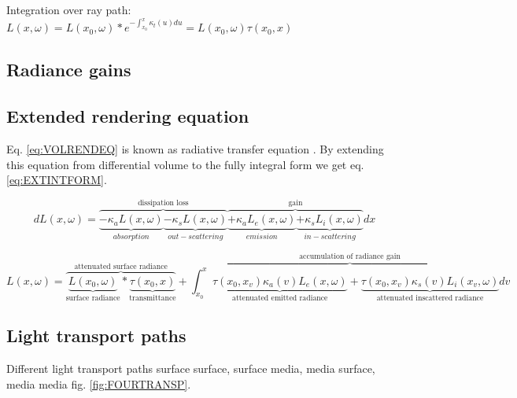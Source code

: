 Integration over ray path:
$L(x,\omega)=L(x_0,\omega)*e^{-\int_{x_{0}}^{x}\kappa_t(u)du}=L(x_0,\omega)\tau(x_0,x)$


\subsection{Radiance gains}


\subsection{Extended rendering equation}
 Eq. \ref{eq:VOLRENDEQ} is known as radiative transfer equation \cite{chandrasekhar1960radiative}. By extending this equation from differential volume to the fully integral form we get eq. \ref{eq:EXTINTFORM}.

\begin{equation}
\label{eq:VOLRENDEQ}
dL(x,\omega)=\overbrace{\underbrace{{-\kappa_{a}L(x,\omega)} }_{absorption}\underbrace{-\kappa_{s}L(x,\omega)} _{out-scattering} }^\text{dissipation loss}\overbrace{\underbrace{{+\kappa_{a}L_{e}(x,\omega)} }_{emission}\underbrace{+\kappa_{s}L_{i}(x,\omega)} _{in-scattering} }^\text{gain}dx
 \end{equation}
 
 \begin{equation}
 \label{eq:EXTINTFORM}
 L(x,\omega)=\overbrace{\underbrace{L(x_{0},\omega)}_{\text{surface radiance}}*\underbrace{\tau(x_{0},x) }_{\text{transmittance}}}^{\text{attenuated surface radiance}}+
\overbrace{
  \int_{x_{0}}^{x}
    \underbrace{
      \tau(x_{0},x_{v})\kappa_{a}(v)L_{e}(x,\omega)
     }_{\text{attenuated emitted radiance}}
    +
    \underbrace{
       \tau(x_{0},x_{v})\kappa_{s}(v)L_{i}(x_{v},\omega)
    }_{\text{attenuated inscattered radiance}}
    dv
}^{\text{accumulation of radiance gain}}
 \end{equation} 
 
\subsection{Light transport paths}
Different light transport paths surface surface, surface media, media surface, media media fig. \ref{fig:FOURTRANSP}.


